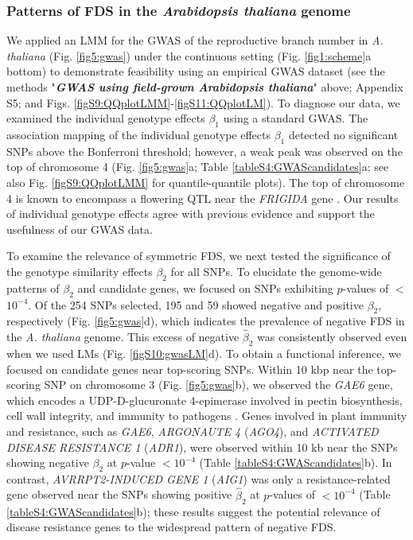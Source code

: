 \documentclass[12pt,]{article}
\begin{document}
\subsubsection{Patterns of FDS in the \textit{Arabidopsis thaliana} genome}
We applied an LMM for the GWAS of the reproductive branch number in \textit{A. thaliana} (Fig. \ref{fig5:gwas}) under the continuous setting (Fig. \ref{fig1:scheme}a bottom) to demonstrate feasibility using an empirical GWAS dataset (see the methods "\textit{\textbf{GWAS using field-grown Arabidopsis thaliana}}" above; Appendix S5; and Figs. \ref{figS9:QQplotLMM}-\ref{figS11:QQplotLM}). To diagnose our data, we examined the individual genotype effects $\beta_1$ using a standard GWAS. The association mapping of the individual genotype effects $\beta_1$ detected no significant SNPs above the Bonferroni threshold; however, a weak peak was observed on the top of chromosome 4 (Fig. \ref{fig5:gwas}a; Table \ref{tableS4:GWAScandidates}a; see also Fig. \ref{figS9:QQplotLMM} for quantile-quantile plots). The top of chromosome 4 is known to encompass a flowering QTL near the \textit{FRIGIDA} gene \citep{atwell2010genome}. Our results of individual genotype effects agree with previous evidence and support the usefulness of our GWAS data.

To examine the relevance of symmetric FDS, we next tested the significance of the genotype similarity effects $\beta_2$ for all SNPs. To elucidate the genome-wide patterns of $\beta_2$ and candidate genes, we focused on SNPs exhibiting $p$-values of $<$ $10^{-4}$. Of the 254 SNPs selected, 195 and 59 showed negative and positive $\beta_2$, respectively (Fig. \ref{fig5:gwas}d), which indicates the prevalence of negative FDS in the \textit{A. thaliana} genome. This excess of negative $\hat{\beta}_2$ was consistently observed even when we used LMs (Fig. \ref{figS10:gwasLM}d). To obtain a functional inference, we focused on candidate genes near top-scoring SNPs. Within 10 kbp near the top-scoring SNP on chromosome 3 (Fig. \ref{fig5:gwas}b), we observed the \textit{GAE6} gene, which encodes a UDP-D-glucuronate 4-epimerase involved in pectin biosynthesis, cell wall integrity, and immunity to pathogens \citep{bethke2016pectin}. Genes involved in plant immunity and resistance, such as \textit{GAE6}, \textit{ARGONAUTE 4} (\textit{AGO4}), and \textit{ACTIVATED DISEASE RESISTANCE 1} (\textit{ADR1}), were observed within 10 kb near the SNPs showing negative $\beta_2$ at $p$-value $< 10^{-4}$ (Table \ref{tableS4:GWAScandidates}b). In contrast, \textit{AVRRPT2-INDUCED GENE 1} (\textit{AIG1}) was only a resistance-related gene observed near the SNPs showing positive $\hat{\beta}_2$ at $p$-values of $< 10^{-4}$ (Table \ref{tableS4:GWAScandidates}b); these results suggest the potential relevance of disease resistance genes to the widespread pattern of negative FDS.
\end{document}
